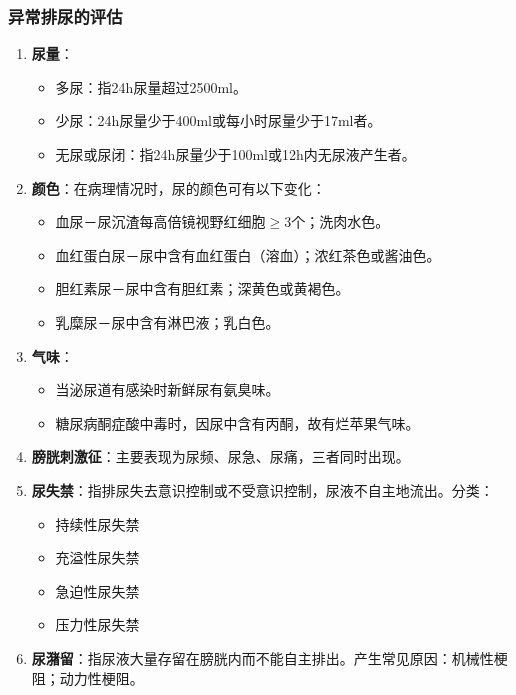 \documentclass[11pt, a4paper]{ctexart}
\begin{document}
\subsubsection{异常排尿的评估}
\begin{enumerate}
	\item \textbf{尿量}：
	      \begin{itemize}
		      \item 多尿：指24h尿量超过2500ml。
		      \item 少尿：24h尿量少于400ml或每小时尿量少于17ml者。
		      \item 无尿或尿闭：指24h尿量少于100ml或12h内无尿液产生者。
	      \end{itemize}
	\item \textbf{颜色}：在病理情况时，尿的颜色可有以下变化：
	      \begin{itemize}
		      \item 血尿－尿沉渣每高倍镜视野红细胞$\geq$3个；洗肉水色。
		      \item 血红蛋白尿－尿中含有血红蛋白（溶血）；浓红茶色或酱油色。
		      \item 胆红素尿－尿中含有胆红素；深黄色或黄褐色。
		      \item 乳糜尿－尿中含有淋巴液；乳白色。
	      \end{itemize}
	\item \textbf{气味}：
	      \begin{itemize}
		      \item 当泌尿道有感染时新鲜尿有氨臭味。
		      \item 糖尿病酮症酸中毒时，因尿中含有丙酮，故有烂苹果气味。
	      \end{itemize}
	\item \textbf{膀胱刺激征}：主要表现为尿频、尿急、尿痛，三者同时出现。
	\item \textbf{尿失禁}：指排尿失去意识控制或不受意识控制，尿液不自主地流出。分类：
	      \begin{itemize}
		      \item 持续性尿失禁
		      \item 充溢性尿失禁
		      \item 急迫性尿失禁
		      \item 压力性尿失禁
	      \end{itemize}
	\item \textbf{尿潴留}：指尿液大量存留在膀胱内而不能自主排出。产生常见原因：机械性梗阻；动力性梗阻。
\end{enumerate}
\end{document}
